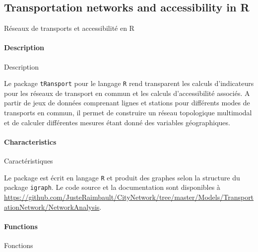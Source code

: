 





\subsection{Transportation networks and accessibility in R}{Réseaux de transports et accessibilité en R}


\paragraph{Description}{Description}

Le package \texttt{tRansport} pour le langage \texttt{R} rend transparent les calculs d'indicateurs pour les réseaux de transport en commun et les calculs d'accessibilité associés. A partir de jeux de données comprenant lignes et stations pour différents modes de transports en commun, il permet de construire un réseau topologique multimodal et de calculer différentes mesures étant donné des variables géographiques.


\paragraph{Characteristics}{Caractéristiques}

Le package est écrit en langage \texttt{R} et produit des graphes selon la structure du package \texttt{igraph}. Le code source et la documentation sont disponibles à \url{https://github.com/JusteRaimbault/CityNetwork/tree/master/Models/TransportationNetwork/NetworkAnalysis}.


\paragraph{Functions}{Fonctions}

